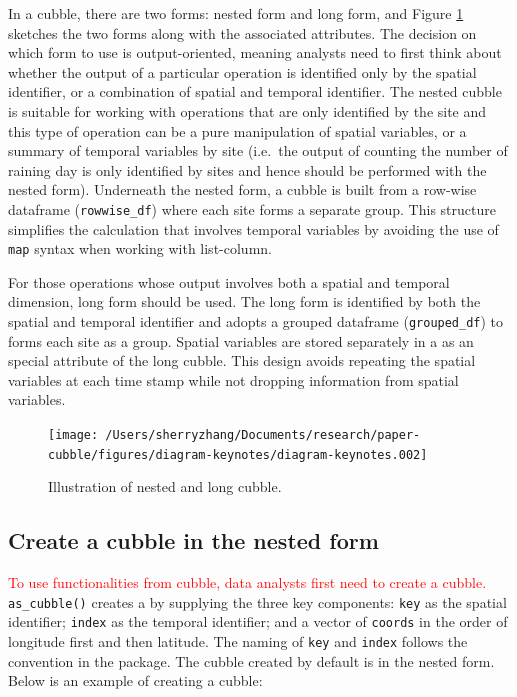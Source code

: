 \documentclass[
]{jss}
\begin{document}
In a cubble, there are two forms: nested form and long form, and Figure
\ref{fig:illu-cubble} sketches the two forms along with the associated
attributes. The decision on which form to use is output-oriented,
meaning analysts need to first think about whether the output of a
particular operation is identified only by the spatial identifier, or a
combination of spatial and temporal identifier. The nested cubble is
suitable for working with operations that are only identified by the
site and this type of operation can be a pure manipulation of spatial
variables, or a summary of temporal variables by site (i.e.~the output
of counting the number of raining day is only identified by sites and
hence should be performed with the nested form). Underneath the nested
form, a cubble is built from a row-wise dataframe (\texttt{rowwise\_df})
where each site forms a separate group. This structure simplifies the
calculation that involves temporal variables by avoiding the use of
\texttt{map} syntax when working with list-column.

For those operations whose output involves both a spatial and temporal
dimension, long form should be used. The long form is identified by both
the spatial and temporal identifier and adopts a grouped dataframe
(\texttt{grouped\_df}) to forms each site as a group. Spatial variables
are stored separately in a  as an special attribute of the
long cubble. This design avoids repeating the spatial variables at each
time stamp while not dropping information from spatial variables.

\begin{CodeChunk}
\begin{figure}

{\centering \texttt{[image: /Users/sherryzhang/Documents/research/paper-cubble/figures/diagram-keynotes/diagram-keynotes.002]} 

}

\caption[Illustration of nested and long cubble]{Illustration of nested and long cubble.}\label{fig:illu-cubble}
\end{figure}
\end{CodeChunk}

\hypertarget{create-a-cubble-in-the-nested-form}{%
\subsection{Create a cubble in the nested
form}\label{create-a-cubble-in-the-nested-form}}

\textcolor{red}{To use functionalities from cubble, data analysts first need to create a cubble.}
\texttt{as\_cubble()} creates a  by supplying the three key
components: \texttt{key} as the spatial identifier; \texttt{index} as
the temporal identifier; and a vector of \texttt{coords} in the order of
longitude first and then latitude. The naming of \texttt{key} and
\texttt{index} follows the convention in the  package. The
cubble created by default is in the nested form. Below is an example of
creating a cubble: \newline
\end{document}
